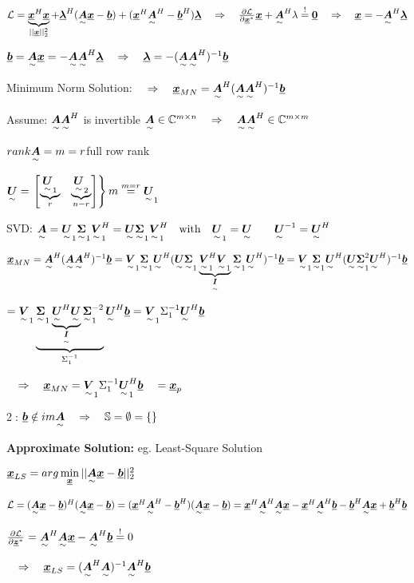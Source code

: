 $\mathcal{L}=\underbrace{\vec{x}^H\vec{x}}_{||\vec{x}||^2_2}+\vec{\lambda}^H(\ma{A}\vec{x}-\vec{b})+(\vec{x}^H\ma{A}^H-\vec{b}^H)\vec{\lambda}
\pfeil\frac{\partial\mathcal{L}}{\partial\vec{x}^*}\vec{x}+\ma{A}^H\lambda\overset{!}{=}\vec{0}
\pfeil\vec{x}=-\ma{A}^H\vec{\lambda}$

$\vec{b}=\ma{A}\vec{x}=-\ma{A}\ma{A}^H\vec{\lambda}\pfeil \vec{\lambda}=-(\ma{A}\ma{A}^H)^{-1}\vec{b}$

Minimum Norm Solution: $\pfeil \vec{x}_{MN}=\ma{A}^H(\ma{A}\ma{A}^H)^{-1}\vec{b}$

Assume: $\ma{A}\ma{A}^H$ is invertible $\ma{A}\in\mathbb{C}^{m\times n}\pfeil \ma{A}\ma{A}^H\in\mathbb{C}^{m\times m}$

$rank\ma{A}=m=r$\quad full row rank

$\ma{U}=\left.\mat{\underbrace{\ma{U}_1}_{r}&\underbrace{\ma{U}_2}_{n-r}}\right\rbrace m \overset{m=r}{=}\ma{U}_1$

SVD: $\ma{A}=\ma{U}_1\ma{\Sigma}_1\ma{V}_1^H=\ma{U}\ma{\Sigma}_1\ma{V}_1^H \with \ma{U}_1=\ma{U} \qquad \ma{U}^{-1} = \ma{U}^H$

$\vec{x}_{MN}=\ma{A}^H(\ma{A}\ma{A}^H)^{-1}\vec{b}
=\ma{V}_1\ma{\Sigma}_1\ma{U}^H(\ma{U}\ma{\Sigma}_1\underbrace {\ma{V}_1^H\ma{V}_1}_{\ma{I}}\ma{\Sigma}_1\ma{U}^H)^{-1}\vec{b}
=\ma{V}_1\ma{\Sigma}_1\ma{U}^H(\ma{U}\ma{\Sigma}_1^2\ma{U}^H)^{-1}\vec{b}$

$=\ma{V}_1\underbrace{\ma{\Sigma}_1\underbrace{\ma{U}^H\ma{U}}_{\ma{I}}\ma{\Sigma}_1^{-2}}_{\Sigma_1^{-1}}\ma{U}^H\vec{b}
=\ma{V}_1\Sigma_1^{-1}\ma{U}^H\vec{b}$

$\pfeil\vec{x}_{MN}=\ma{V}_1\Sigma_1^{-1}\ma{U}_1^H\vec{b}   \quad = \vec{x}_p$ 


\textcircled{2}:  $\vec{b}\notin im\ma{A}\pfeil \mathbb{S}=\emptyset=\left\lbrace\right\rbrace$

\textbf{Approximate Solution:} eg. Least-Square Solution

$\vec{x}_{LS}=arg\min\limits_{\vec{x}}||\ma{A}\vec{x}-\vec{b}||^2_2$

$\mathcal{L}=(\ma{A}\vec{x}-\vec{b})^H(\ma{A}\vec{x}-\vec{b})=(\vec{x}^H\ma{A}^H-\vec{b}^H)(\ma{A}\vec{x}-\vec{b})=\vec{x}^H\ma{A}^H\ma{A}\vec{x}-\vec{x}^H\ma{A}^H\vec{b}-\vec{b}^H\ma{A}\vec{x}+\vec{b}^H\vec{b}$

$\frac{\partial \mathcal{L}}{\partial \vec{z}^*}=\ma{A}^H\ma{A}\vec{x}-\ma{A}^H\vec{b}\overset{!}{=}0$

$ \pfeil \vec{x}_{LS}=(\ma{A}^H\ma{A})^{-1}\ma{A}^H\vec{b}$


